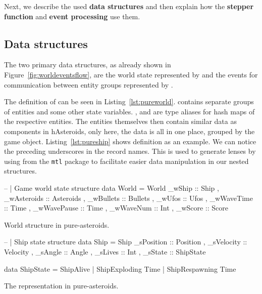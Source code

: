 \documentclass[
  digital, %
  color,   %
  table,   %
  oneside, %
  lof,     %
  lot,     %
]{fithesis3}
\newcommand{\packagename}{\texttt}
\begin{document}
Next, we describe the used \textbf{data structures} and then explain
how the \textbf{stepper function} and \textbf{event processing} use them.



\subsection{Data structures}

The two primary data structures, as already shown in Figure~\ref{fig:worldeventsflow},
are the world state represented by  and the events for communication
between entity groups represented by .

The definition of  can be seen in Listing~\ref{lst:pureworld}.
 contains separate groups of entities and some other state variables.
,  and  are type
aliases for hash maps of the respective entities.
The entities themselves then contain similar data as components in hAsteroids,
only here, the data is all in one place, grouped by the game object.
Listing~\ref{lst:pureship} shows  definition as an example.
We can notice the preceding underscores in the record names. This is used
to generate lenses by using  from the \packagename{mtl} package
to facilitate easier data manipulation in our nested structures.

\begin{listing}[H]
\begin{haskell}
-- | Game world state structure 
data World =
    World
    { _wShip      :: Ship 
    , _wAsteroids :: Asteroids
    , _wBullets   :: Bullets
    , _wUfos      :: Ufos
    , _wWaveTime  :: Time
    , _wWavePause :: Time
    , _wWaveNum   :: Int
    , _wScore     :: Score
    }
\end{haskell}
\caption{World structure in pure-asteroids.}
\label{lst:pureworld}
\end{listing}

\begin{listing}[H]
\begin{haskell}
-- | Ship state structure
data Ship =
    Ship 
    { _sPosition :: Position
    , _sVelocity :: Velocity
    , _sAngle    :: Angle
    , _sLives    :: Int
    , _sState    :: ShipState
    }

data ShipState
    = ShipAlive
    | ShipExploding Time
    | ShipRespawning Time
\end{haskell}
\caption{The  representation in pure-asteroids.}
\label{lst:pureship}
\end{listing}
\end{document}

